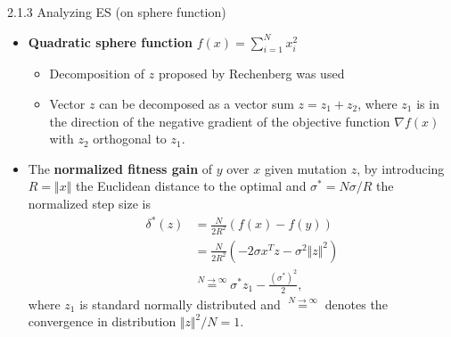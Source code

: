 \documentclass{beamer}
\begin{document}
\begin{frame}{2.1.3 Analyzing ES (on sphere function)}
\begin{itemize}
    \item \textbf{Quadratic sphere function} $f(x) = \sum_{i=1}^N x_i^2$ 
    \begin{itemize}
        \item Decomposition of $z$ proposed by Rechenberg was used
        \item Vector $z$ can be decomposed as a vector sum $z = z_1 + z_2$, where $z_1$ is in the direction of the negative gradient of the objective function $\nabla f(x)$ with $z_2$ orthogonal to $z_1$.
    \end{itemize}
    \item The \textbf{normalized fitness gain} of $y$ over $x$ given mutation $z$, by introducing $R = \Vert x \Vert$ the Euclidean distance to the optimal and $\sigma^* = N \sigma/R$ the normalized step size is 
    \begin{align}{}
        \delta^*(z) & = \frac{N}{2R^2}\left( f(x) - f(y)\right)  \nonumber\\
        & = \frac{N}{2R^2} (-2 \sigma x^Tz - \sigma^2 \Vert z \Vert^2 ) \nonumber\\
        & \overset{N \rightarrow \infty}{=} \sigma^* z_{1} - \frac{(\sigma^*) ^2}{2} \nonumber,
        \end{align}
        where $z_1$ is standard normally distributed and $\overset{ N \rightarrow \infty}{=}$ denotes the convergence in distribution $\Vert z \Vert^2/N = 1$.

\end{itemize}
\end{frame}
\end{document}
